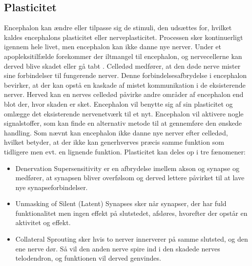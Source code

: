 \subsection{Plasticitet}
Encephalon kan ændre eller tilpasse sig de stimuli, den udsættes for, hvilket kaldes encephalons plasticitet eller nerveplasticitet. Processen sker kontinuerligt igennem hele livet, men encephalon kan ikke danne nye nerver. \cite{Stanfield2014} Under et apopleksitilfælde forekommer der iltmangel til encephalon, og nervecellerne kan derved blive skadet eller gå tabt \cite{Schulze2011}. Celledød medfører, at den døde nerve mister sine forbindelser til fungerende nerver. Denne forbindelsesafbrydelse i encephalon bevirker, at der kan opstå en kaskade af mistet kommunikation i de eksisterende nerver. Herved kan en nerves celledød påvirke andre områder af encephalon end blot der, hvor skaden er sket. \cite{Raine2009} Encephalon vil benytte sig af sin plasticitet og omlægge det eksisterende nervenetværk til et nyt. Encephalon vil aktivere nogle signalstoffer, som kan finde en alternativ metode til at gennemføre den ønskede handling. \cite{Rugnett2015}  Som nævnt kan encephalon ikke danne nye nerver efter celledød, hvilket betyder, at der ikke kan generhverves præcis samme funktion som tidligere men evt. en lignende funktion. %
Plasticitet kan deles op i tre fænomener: \cite{Raine2009}

\begin{itemize}
	\item Denervation Supersensitivity er en afbrydelse imellem akson og synapse og medfører, at synapsen bliver overfølsom og derved lettere påvirket til at lave nye synapseforbindelser.
	\item Unmasking of Silent (Latent) Synapses sker når synapser, der har fuld funktionalitet men ingen effekt på slutstedet, afsløres, hvorefter der opstår en aktivitet og effekt. 
	\item Collateral Sprouting sker hvis to nerver innerverer på samme slutsted, og den ene nerve dør. Så vil den anden nerve spire ind i den skadede nerves telodendron, og funktionen vil derved genvindes.
\end{itemize}

